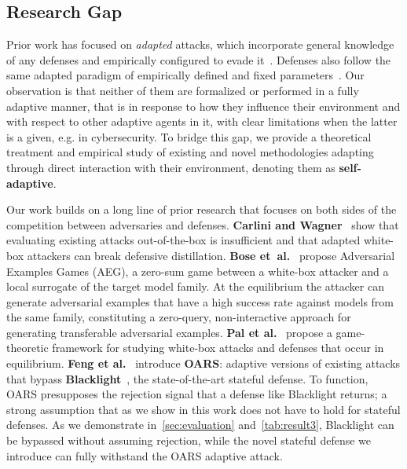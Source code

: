 \subsection{Research Gap}
Prior work has focused on \textit{adapted} attacks, which incorporate general knowledge of any defenses and empirically configured to evade it~\cite{carlini2017towards, chen2020hopskipjumpattack, brendel2018decision}.
Defenses also follow the same adapted paradigm of empirically defined and fixed parameters~\cite{chen2020stateful, li2022blacklight}.
Our observation is that neither of them are formalized or performed in a fully adaptive manner, that is in response to how they influence their environment and with respect to other adaptive agents in it, with clear limitations when the latter is a given, e.g. in cybersecurity.
To bridge this gap, we provide a theoretical treatment and empirical study of existing and novel methodologies adapting through direct interaction with their environment, denoting them as \textbf{self-adaptive}.

Our work builds on a long line of prior research that focuses on both sides of the competition between adversaries and defenses.
\textbf{Carlini and Wagner}~\cite{carlini2017towards} show that evaluating existing attacks out-of-the-box is insufficient and that adapted white-box attackers can break defensive distillation.
\textbf{Bose et~al.}~\cite{bose2020adversarial} propose Adversarial Examples Games (AEG), a zero-sum game between a white-box attacker and a local surrogate of the target model family.
At the equilibrium the attacker can generate adversarial examples that have a high success rate against models from the same family, constituting a zero-query, non-interactive approach for generating transferable adversarial examples.
\textbf{Pal et al.}~\cite{pal2020game} propose a game-theoretic framework for studying white-box attacks and defenses that occur in equilibrium.
\textbf{Feng et al.}~\cite{feng2023stateful} introduce \textbf{OARS}: adaptive versions of existing attacks that bypass \textbf{Blacklight}~\cite{li2022blacklight}, the state-of-the-art stateful defense.
To function, OARS presupposes the rejection signal that a defense like Blacklight returns; a strong assumption that as we show in this work does not have to hold for stateful defenses.
As we demonstrate in~\autoref{sec:evaluation} and~\autoref{tab:result3}, Blacklight can be bypassed without assuming rejection, while the novel stateful defense we introduce can fully withstand the OARS adaptive attack.

